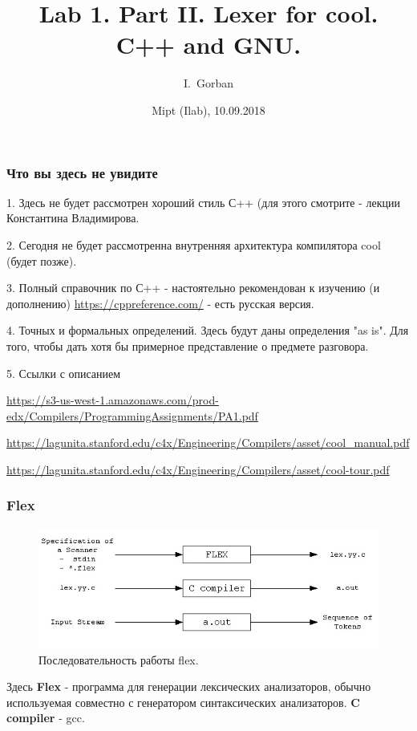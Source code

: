 \documentclass[10pt,fullscreen=true, bookmarks=false]{beamer}
\title{Lab 1. Part II. Lexer for cool. C++ and GNU. }
\author{I.~Gorban}
\date{Mipt (Ilab), 10.09.2018}
\begin{document}
\begin{frame}
\titlepage
\end{frame}

\begin{frame}[fragile]
\frametitle{Что вы здесь не увидите}

1. Здесь не будет рассмотрен хороший стиль С++ (для этого смотрите - лекции Константина Владимирова.

2. Сегодня не будет рассмотренна внутренняя архитектура компилятора cool (будет позже).

3. Полный справочник по С++ - настоятельно рекомендован к изучению (и дополнению) \url{https://cppreference.com/} - есть русская версия.

4. Точных и формальных определений. Здесь будут даны определения "as is". Для того, чтобы дать хотя бы примерное представление о предмете разговора.

5. Ссылки с описанием 

\url{https://s3-us-west-1.amazonaws.com/prod-edx/Compilers/ProgrammingAssignments/PA1.pdf}

\url{https://lagunita.stanford.edu/c4x/Engineering/Compilers/asset/cool_manual.pdf}

\url{https://lagunita.stanford.edu/c4x/Engineering/Compilers/asset/cool-tour.pdf}

\tableofcontents[pausesections]
\end{frame}

\begin{frame}[fragile]
\frametitle{Flex}

\begin{figure}
  \includegraphics[width=\linewidth]{flex.jpg}
  \caption{Последовательность работы flex.}
\end{figure}

Здесь {\bf Flex} - программа для генерации лексических анализаторов, обычно используемая совместно с генератором синтаксических анализаторов. {\bf C compiler} - gcc.

\tableofcontents[pausesections]
\end{frame}
\end{document}
